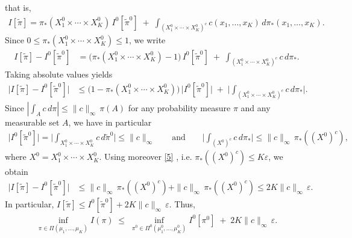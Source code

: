 \documentclass[twoside,11pt,a4paper]{article}
\newcommand*{\SavedEqref}{}
\let\SavedEqref\eqref
\renewcommand*{\eqref}[1]{  \begingroup
    \hypersetup{
      linkcolor=linkequation,
      linkbordercolor=linkequation,
    }    \SavedEqref{#1}  \endgroup
}
\begin{document}
that is,
\begin{align*}
I[\widetilde{\pi}]
=
\pi_*(X_1^0 \times \cdots \times X_K^0)\, I^0[\widetilde{\pi}^0]
\;+\;
\int_{(X_1^0 \times \cdots \times X_K^0)^c}
c(x_1,\dots,x_K)\, d\pi_*(x_1,\dots,x_K).
\end{align*}
Since $0 \leq \pi_*(X_1^0 \times \cdots \times X_K^0) \leq 1$, we write
\begin{align*}
I[\widetilde{\pi}]
- I^0[\widetilde{\pi}^0]
&=
\big(\pi_*(X_1^0 \times \cdots \times X_K^0)-1\big)\,
I^0[\widetilde{\pi}^0]
\;+\;
\int_{(X_1^0 \times \cdots \times X_K^0)^c} c\, d\pi_* .
\end{align*}
Taking absolute values yields
\begin{align*}
\big|I[\widetilde{\pi}] - I^0[\widetilde{\pi}^0]\big|
&\le
\big(1-\pi_*(X_1^0 \times \cdots \times X_K^0)\big)\,\big|I^0[\widetilde{\pi}^0]\big|
\;+\;
\Big|\int_{(X_1^0 \times \cdots \times X_K^0)^c} c\, d\pi_*\Big|.
\end{align*}
Since $|\int_A c\,d\pi|\le \|c\|_\infty\,\pi(A)$ for any probability measure $\pi$ and any measurable set $A$, 
we have in particular
\begin{align*}
\big|I^0[\widetilde{\pi}^0]\big| =
\Big|\int_{X_1^0\times\cdots\times X_K^0} c\,d\widetilde{\pi}^0\Big|
\le \|c\|_\infty
\qquad\text{and}\qquad 
\Big|\int_{(X^0)^c} c\, d\pi_*\Big|
\le \|c\|_\infty\,\pi_*((X^0)^c),
\end{align*}
where $X^0=X_1^0\times\cdots\times X_K^0$. Using moreover \eqref{5}, i.e.
$\pi_*((X^0)^c)\le K\varepsilon$, we obtain
\begin{align*}
\big|I[\widetilde{\pi}] - I^0[\widetilde{\pi}^0]\big|
&\le
\|c\|_\infty\,\pi_*((X^0)^c)
+\|c\|_\infty\,\pi_*((X^0)^c)
\le 2K\|c\|_\infty\,\varepsilon.
\end{align*}
In particular, $ I[\widetilde{\pi}]\le I^0[\widetilde{\pi}^0] + 2K\|c\|_\infty\,\varepsilon.$
Thus,
\begin{align*}
\inf_{\pi\in\Pi(\mu_1,\ldots,\mu_K)} I(\pi)
\;\le\;
\inf_{\pi^0\in\Pi^0(\mu_1^0,\ldots,\mu_K^0)} I^0[\pi^0]
\;+\;
2K\|c\|_\infty\,\varepsilon.
\end{align*}
\end{document}
